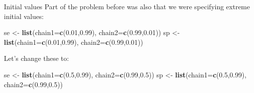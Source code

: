 \documentclass[
  ignorenonframetext,
]{beamer}
\newenvironment{Shaded}{\begin{snugshade}}{\end{snugshade}}
\newcommand{\AttributeTok}[1]{\textcolor[rgb]{0.13,0.29,0.53}{#1}}
\newcommand{\FloatTok}[1]{\textcolor[rgb]{0.00,0.00,0.81}{#1}}
\newcommand{\FunctionTok}[1]{\textcolor[rgb]{0.13,0.29,0.53}{\textbf{#1}}}
\newcommand{\NormalTok}[1]{#1}
\newcommand{\OtherTok}[1]{\textcolor[rgb]{0.56,0.35,0.01}{#1}}
\begin{document}
\begin{frame}[fragile]
\begin{block}{Initial values}
\protect\hypertarget{initial-values}{}
Part of the problem before was also that we were specifying extreme
initial values:

\scriptsize

\begin{Shaded}
\begin{Highlighting}[]
\NormalTok{se }\OtherTok{\textless{}{-}} \FunctionTok{list}\NormalTok{(}\AttributeTok{chain1=}\FunctionTok{c}\NormalTok{(}\FloatTok{0.01}\NormalTok{,}\FloatTok{0.99}\NormalTok{), }\AttributeTok{chain2=}\FunctionTok{c}\NormalTok{(}\FloatTok{0.99}\NormalTok{,}\FloatTok{0.01}\NormalTok{))}
\NormalTok{sp }\OtherTok{\textless{}{-}} \FunctionTok{list}\NormalTok{(}\AttributeTok{chain1=}\FunctionTok{c}\NormalTok{(}\FloatTok{0.01}\NormalTok{,}\FloatTok{0.99}\NormalTok{), }\AttributeTok{chain2=}\FunctionTok{c}\NormalTok{(}\FloatTok{0.99}\NormalTok{,}\FloatTok{0.01}\NormalTok{))}
\end{Highlighting}
\end{Shaded}

\normalsize

\pause

Let's change these to:

\scriptsize

\begin{Shaded}
\begin{Highlighting}[]
\NormalTok{se }\OtherTok{\textless{}{-}} \FunctionTok{list}\NormalTok{(}\AttributeTok{chain1=}\FunctionTok{c}\NormalTok{(}\FloatTok{0.5}\NormalTok{,}\FloatTok{0.99}\NormalTok{), }\AttributeTok{chain2=}\FunctionTok{c}\NormalTok{(}\FloatTok{0.99}\NormalTok{,}\FloatTok{0.5}\NormalTok{))}
\NormalTok{sp }\OtherTok{\textless{}{-}} \FunctionTok{list}\NormalTok{(}\AttributeTok{chain1=}\FunctionTok{c}\NormalTok{(}\FloatTok{0.5}\NormalTok{,}\FloatTok{0.99}\NormalTok{), }\AttributeTok{chain2=}\FunctionTok{c}\NormalTok{(}\FloatTok{0.99}\NormalTok{,}\FloatTok{0.5}\NormalTok{))}
\end{Highlighting}
\end{Shaded}

\normalsize
\end{block}
\end{frame}
\end{document}
